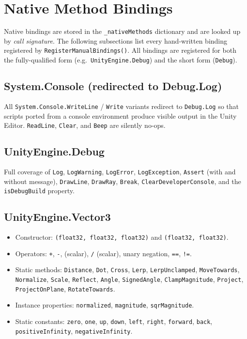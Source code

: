 \documentclass[11pt,a4paper]{article}
\newcommand{\code}[1]{\texttt{\small #1}}
\begin{document}
\section{Native Method Bindings}

Native bindings are stored in the \code{\_nativeMethods} dictionary and are
looked up by \emph{call signature}. The following subsections list every
hand-written binding registered by \code{RegisterManualBindings()}.
All bindings are registered for both the fully-qualified form (e.g.\
\code{UnityEngine.Debug}) and the short form (\code{Debug}).

\subsection{System.Console (redirected to Debug.Log)}

All \code{System.Console.WriteLine} / \code{Write} variants redirect to
\code{Debug.Log} so that scripts ported from a console environment produce
visible output in the Unity Editor. \code{ReadLine}, \code{Clear}, and
\code{Beep} are silently no-ops.

\subsection{UnityEngine.Debug}

Full coverage of \code{Log}, \code{LogWarning}, \code{LogError},
\code{LogException}, \code{Assert} (with and without message), \code{DrawLine},
\code{DrawRay}, \code{Break}, \code{ClearDeveloperConsole}, and the
\code{isDebugBuild} property.

\subsection{UnityEngine.Vector3}

\begin{itemize}[leftmargin=2em, noitemsep]
  \item Constructor: \code{(float32, float32, float32)} and \code{(float32, float32)}.
  \item Operators: \code{+}, \code{-}, \code{*} (scalar), \code{/} (scalar),
        unary negation, \code{==}, \code{!=}.
  \item Static methods: \code{Distance}, \code{Dot}, \code{Cross},
        \code{Lerp}, \code{LerpUnclamped}, \code{MoveTowards}, \code{Normalize},
        \code{Scale}, \code{Reflect}, \code{Angle}, \code{SignedAngle},
        \code{ClampMagnitude}, \code{Project}, \code{ProjectOnPlane},
        \code{RotateTowards}.
  \item Instance properties: \code{normalized}, \code{magnitude}, \code{sqrMagnitude}.
  \item Static constants: \code{zero}, \code{one}, \code{up}, \code{down},
        \code{left}, \code{right}, \code{forward}, \code{back},
        \code{positiveInfinity}, \code{negativeInfinity}.
\end{itemize}
\end{document}
